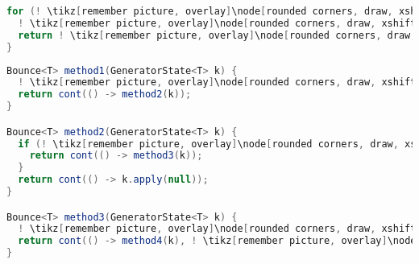 \pagebreak

\begin{center}
\begin{mdframed}[topline=true]
\begin{minipage}[t]{0.4\textwidth}
\begin{lstlisting}[language=Java, numbers=none, breaklines=true]
for (! \tikz[remember picture, overlay]\node[rounded corners, draw, xshift=-0.1cm, inner sep=5pt, anchor=west, yshift=0.1cm] {Init}; \hspace*{0.6cm}!; ! \tikz[remember picture, overlay]\node[rounded corners, draw, xshift=-0.2cm, inner sep=5pt, anchor=west, yshift=0.1cm] {Feltétel}; \hspace*{1.0cm}!; ! \tikz[remember picture, overlay]\node[rounded corners, draw, xshift=-0.2cm, inner sep=5pt, anchor=west, yshift=0.1cm] {Frissít}; \vspace*{0.3cm} \hspace*{0.9cm}!) {
  ! \tikz[remember picture, overlay]\node[rounded corners, draw, xshift=-0.1cm, inner sep=5pt, anchor=west] {Kódrészlet}; \vspace*{0.5cm} ! 
  return ! \tikz[remember picture, overlay]\node[rounded corners, draw, xshift=-0.1cm, inner sep=5pt, anchor=west, yshift=0.1cm] {Kifejezés}; \vspace*{0.3cm} !
}
\end{lstlisting}
\end{minipage} 
\begin{minipage}[t]{0.6\textwidth}
\begin{lstlisting}[language=Java, numbers=none, breaklines=true]
Bounce<T> method1(GeneratorState<T> k) {
  ! \tikz[remember picture, overlay]\node[rounded corners, draw, xshift=-0.1cm, inner sep=5pt, anchor=west] {Init}; \vspace*{0.3cm} !
  return cont(() -> method2(k));
}

Bounce<T> method2(GeneratorState<T> k) {
  if (! \tikz[remember picture, overlay]\node[rounded corners, draw, xshift=-0.1cm, inner sep=5pt, anchor=west, yshift=0.1cm] {Feltétel}; \hspace*{1.04cm} !) {
    return cont(() -> method3(k));
  }
  return cont(() -> k.apply(null));
}

Bounce<T> method3(GeneratorState<T> k) {
  ! \tikz[remember picture, overlay]\node[rounded corners, draw, xshift=-0.1cm, inner sep=5pt, anchor=west] {Kódrészlet}; \vspace*{0.3cm} !
  return cont(() -> method4(k), ! \tikz[remember picture, overlay]\node[rounded corners, draw, xshift=-0.1cm, inner sep=5pt, anchor=west, yshift=0.1cm] {Kifejezés}; \vspace*{0.2cm} \hspace*{1.2cm} !);
}


\end{lstlisting}
\end{minipage}
\end{mdframed}
\end{center}
